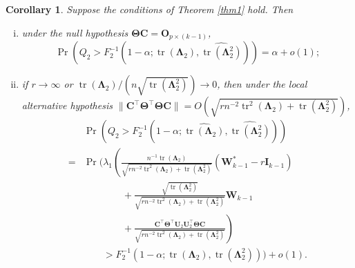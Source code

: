 \documentclass[12pt]{article} %
\DeclareMathOperator{\mytr}{tr}
\newcommand{\bC}{\mathbf{C}}
\newcommand{\bO}{\mathbf{O}}
\newcommand{\bI}{\mathbf{I}}
\newcommand{\bU}{\mathbf{U}}
\newcommand{\bW}{\mathbf{W}}
\newcommand{\bfsym}[1]{\ensuremath{\boldsymbol{#1}}}
\def\bLambda {\bfsym {\Lambda}}
\def\bTheta {\bfsym {\Theta}}
\newtheorem{corollary}{Corollary}
\theoremstyle{definition}
\begin{document}
\begin{corollary}
    Suppose the conditions of Theorem \ref{thm1} hold.
    Then
    \begin{enumerate}[(i)]
        \item 
            under the null hypothesis $\bTheta \bC=\bO_{p\times (k-1)}$,
\begin{equation*}
    \Pr
    \left(
        Q_2
    >
    F_2^{-1}\left(1-\alpha;\widehat{\mytr(\bLambda_2)},\widehat{\mytr(\bLambda_2^2)}\right)
\right)=\alpha +o(1)
        ;
\end{equation*}
        \item
            if $r\to \infty$ or $\mytr(\bLambda_2)/(n \sqrt{\mytr(\bLambda_2^2)})\to 0$, then under the local alternative hypothesis $\|\bC^\top \bTheta^\top \bTheta \bC\|=O(\sqrt{
        rn^{-2} \mytr^2 (\bLambda_2) + \mytr(\bLambda_2^2)
            })$,
\begin{equation*}
\begin{split}
    &\Pr
    \left(
        Q_2
    >
    F_2^{-1}\left(1-\alpha;\widehat{\mytr(\bLambda_2)},\widehat{\mytr(\bLambda_2^2)}\right)
\right)
\\
=
    &\Pr
    \Bigg(
\lambda_1
\left(
\frac{
    n^{-1} \mytr(\bLambda_2)
}{
    \sqrt{
        rn^{-2} \mytr^2 (\bLambda_2) + \mytr(\bLambda_2^2)
    }
}
(\bW_{k-1}^* - r\bI_{k-1})
\right.
\\
&\quad\quad\quad\quad+
\frac{
    \sqrt{\mytr(\bLambda_2^2)}
}{
    \sqrt{
        rn^{-2} \mytr^2 (\bLambda_2) + \mytr(\bLambda_2^2)
    }
}
\bW_{k-1}
\\
&\left.
\quad\quad\quad\quad
+
\frac{
    \bC^\top \bTheta^\top \bU_2 \bU_2^\top \bTheta \bC
}{
    \sqrt{
        rn^{-2} \mytr^2 (\bLambda_2) + \mytr(\bLambda_2^2)
    }
}
\right)
\\
    &\quad\quad>
    F_2^{-1}\left(1-\alpha;\mytr(\bLambda_2),\mytr(\bLambda_2^2)\right)
\Bigg)
+o(1)
.
\end{split}
\end{equation*}
    \end{enumerate}
    \label{kuCor2}
\end{corollary}
\end{document}
